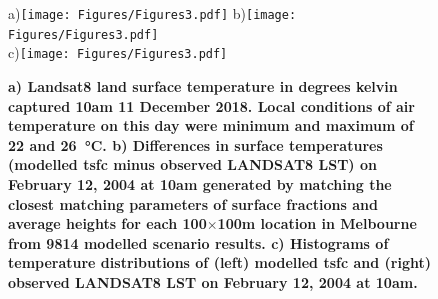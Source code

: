 \documentclass[final,3p,times,authoryear]{elsarticle}
\begin{document}


\begin{figure}
\centering
a)\texttt{[image: Figures/Figures3.pdf]}
b)\texttt{[image: Figures/Figures3.pdf]}\\
c)\texttt{[image: Figures/Figures3.pdf]}
\caption{\bf a) Landsat8 land surface temperature in degrees kelvin captured 10am 11 December 2018. Local conditions of air temperature on this day were minimum and maximum of 22 and 26\SI{}{\degreeCelsius}. b) Differences in surface temperatures (modelled \gls{tsfc} minus observed LANDSAT8 LST) on February 12, 2004 at 10am generated by matching the closest matching parameters of surface fractions and average heights for each 100$\times$100m location in Melbourne from 9814 modelled scenario results. c) Histograms of temperature distributions of (left) modelled \gls{tsfc} and (right) observed LANDSAT8 LST on February 12, 2004 at 10am. }
 \label{fig:TsfcDiffMelb}
\end{figure}
\end{document}
